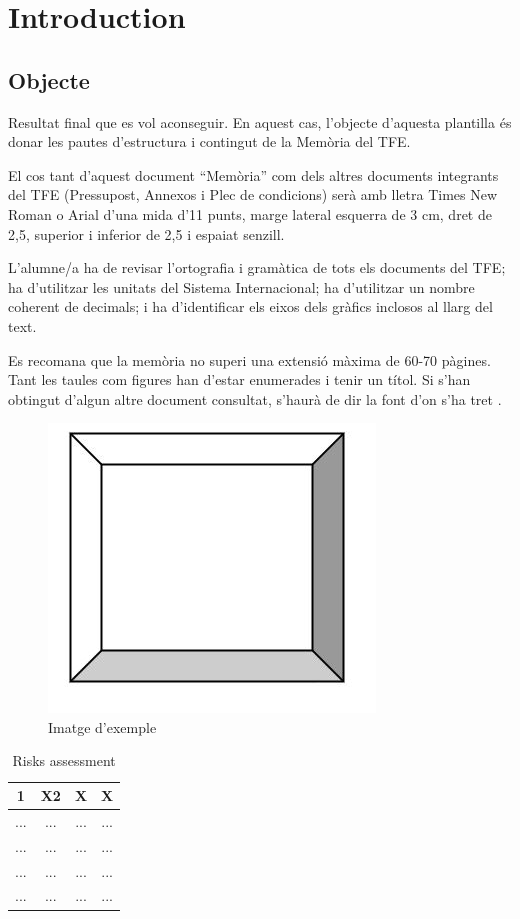 \chapter{Introduction}

\section{Objecte}


Resultat final que es vol aconseguir. En aquest cas, l’objecte d’aquesta plantilla és donar les pautes d’estructura i contingut de la Memòria del TFE. 

El cos tant d’aquest document “Memòria” com dels altres documents integrants del TFE  (Pressupost, Annexos i Plec de condicions) serà amb lletra Times New Roman o Arial d’una mida d’11 punts, marge lateral esquerra de 3 cm, dret de 2,5, superior i inferior de 2,5 i espaiat senzill.

L’alumne/a ha de revisar l’ortografia i gramàtica de tots els documents del TFE; ha d’utilitzar les unitats del Sistema Internacional; ha d’utilitzar un nombre coherent de decimals; i ha d’identificar els eixos dels gràfics inclosos al llarg del text.

Es recomana que la memòria no superi una extensió màxima de 60-70 pàgines. 
Tant les taules com figures han d’estar enumerades i tenir un títol. Si s’han obtingut d’algun altre document consultat, s’haurà de dir la font d’on s’ha tret \cite{eseiaat}.


\begin{figure}[H]
    \centering
    \includegraphics[width=0.3
\linewidth]{Figures/IMATGE_EXEMPLE.jpg}
    \caption{Imatge d'exemple}
    \label{fig:Imatge d'exemple}
\end{figure}


\begin{table}[H]

  \centering
   \caption{Risks assessment} 
   
  \begin{tabular}{|c|c|c|c|}
    \hline
    \textbf{1} & \textbf{X2} & \textbf{X} & \textbf{X} \\
    \hline
    ... & ... & ... & ...\\ \hline
    ... & ... & ... & ...\\ \hline
    ... & ... & ... & ...\\ \hline
    ... & ... & ... & ...\\ \hline
    
  \end{tabular}
  \label{tasks}
 
\end{table}


